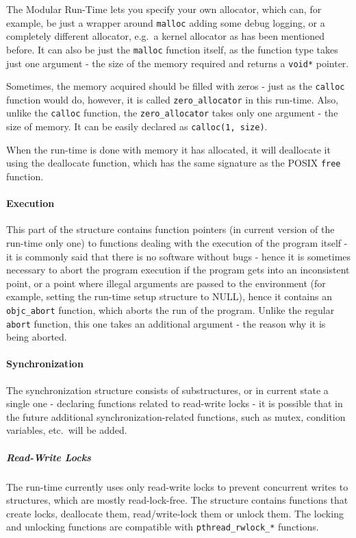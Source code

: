 The Modular Run-Time lets you specify your own allocator, which can, for example, be just a wrapper around \verb=malloc= adding some debug logging, or a completely different allocator, e.g.\ a kernel allocator as has been mentioned before. It can also be just the \verb=malloc= function itself, as the function type takes just one argument - the size of the memory required and returns a \verb=void*= pointer.

Sometimes, the memory acquired should be filled with zeros - just as the \verb=calloc= function would do, however, it is called \verb=zero_allocator= in this run-time. Also, unlike the \verb=calloc= function, the \verb=zero_allocator= takes only one argument - the size of memory. It can be easily declared as \verb=calloc(1, size)=.

When the run-time is done with memory it has allocated, it will deallocate it using the deallocate function, which has the same signature as the POSIX \verb=free= function.

\paragraph{Execution}

This part of the structure contains function pointers (in current version of the run-time only one) to functions dealing with the execution of the program itself - it is commonly said that there is no software without bugs - hence it is sometimes necessary to abort the program execution if the program gets into an inconsistent point, or a point where illegal arguments are passed to the environment (for example, setting the run-time setup structure to NULL), hence it contains an \verb=objc_abort= function, which aborts the run of the program. Unlike the regular \verb=abort= function, this one takes an additional argument - the reason why it is being aborted.

\paragraph{Synchronization}

The synchronization structure consists of substructures, or in current state a single one - declaring functions related to read-write locks - it is possible that in the future additional synchronization-related functions, such as mutex, condition variables, etc.\ will be added.

\subparagraph{Read-Write Locks} The run-time currently uses only read-write locks to prevent concurrent writes to structures, which are mostly read-lock-free. The structure contains functions that create locks, deallocate them, read/write-lock them or unlock them. The locking and unlocking functions are compatible with \newline{}\verb=pthread_rwlock_*= functions.

